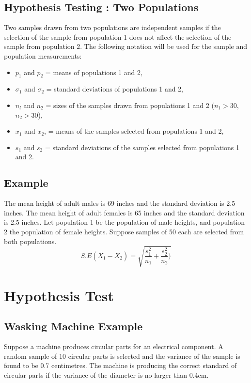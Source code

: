 \subsection{Hypothesis Testing : Two Populations}

Two samples drawn from two populations are independent samples if
the selection of the sample from population 1 does not affect the
selection of the sample from population 2. The following notation
will be used for the sample and population measurements:

\begin{itemize}
	\item $p_1$ and $p_2$ = means of populations 1 and 2,
	
	\item $\sigma_1$ and $\sigma_2$ = standard deviations of
	populations 1 and 2,
	
	\item $n_l$ and $n_2$ = sizes of the samples drawn from
	populations 1 and 2 ($n_1 >30 $, $n_2 >30 $),
	
	\item $x_1$ and $x_2$, = means of the samples selected from
	populations 1 and 2,
	
	\item $s_{1}$ and $s_{2}$ = standard deviations of the samples
	selected from populations 1 and 2.
	
\end{itemize}
\subsection{Example}
The mean height of adult males is 69 inches and the standard
deviation is 2.5 inches. The mean height of adult females is 65
inches and the standard deviation is 2.5 inches. Let population 1
be the population of male heights, and population 2 the population
of female heights. Suppose samples of 50 each are selected from
both populations.
\begin{equation}
S.E(\bar{X}_{1}-\bar{X}_{2}) =
\sqrt{\frac{s^2_{1}}{n_{1}}+\frac{s^2_{2}}{n_{2}})}
\end{equation}


	\section{Hypothesis Test}
	\subsection{Wasking Machine Example}%
	Suppose a machine produces circular parts for an electrical component. A random sample of 10 circular parts is selected and the variance of the sample is found to be 0.7 centimetres. The machine is producing the correct standard of circular parts if the variance of the diameter is no larger than 0.4cm.
	
